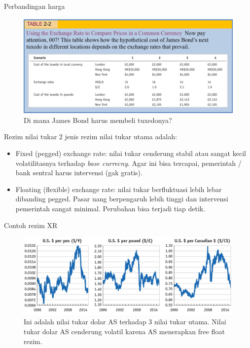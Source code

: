 \documentclass[
  ignorenonframetext,
]{beamer}
\begin{document}
\begin{frame}{Perbandingan harga}
\label{perbandingan-harga}
\begin{figure}[H]

{\centering \includegraphics{Picture1.png}

}

\caption{Di mana James Bond harus membeli tuxedonya?}

\end{figure}%
\end{frame}

\begin{frame}{Rezim nilai tukar}
\label{rezim-nilai-tukar}
2 jenis rezim nilai tukar utama adalah:

\begin{itemize}
\item
  Fixed (pegged) exchange rate: nilai tukar cenderung stabil atau sangat
  kecil volatilitasnya terhadap \emph{base currecny}. Agar ini bisa
  tercapai, pemerintah / bank sentral harus intervensi (gak gratis).
\item
  Floating (flexible) exchange rate: nilai tukar berfluktuasi lebih
  lebar dibanding pegged. Pasar uang berpengaruh lebih tinggi dan
  intervensi pemerintah sangat minimal. Perubahan bisa terjadi tiap
  detik.
\end{itemize}
\end{frame}

\begin{frame}{Contoh rezim XR}
\label{contoh-rezim-xr}
\begin{figure}[H]

{\centering \includegraphics{Picture2.jpg}

}

\caption{Ini adalah nilai tukar dolar AS terhadap 3 nilai tukar utama.
Nilai tukar dolar AS cenderung volatil karena AS menerapkan free float
rezim.}

\end{figure}%
\end{frame}
\end{document}
